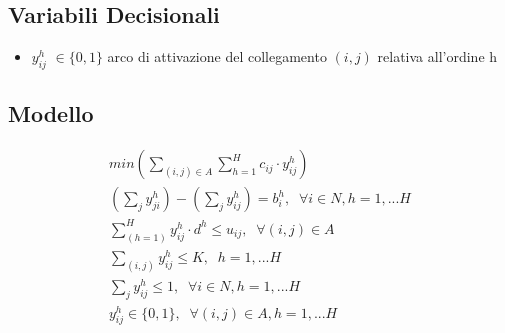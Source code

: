 \documentclass{article}
\begin{document}

\subsection{Variabili Decisionali}
\begin{itemize}
    \item $y_{ij}^h$ $\in \{0,1\}$ arco di attivazione del collegamento $(i,j)$ relativa all'ordine h
\end{itemize}

\subsection{Modello}

\label{problem1}
\begin{align}
    min (\sum_{(i,j) \in A}\sum_{h=1}^H c_{ij} \cdot y_{ij}^h)
    \label{mod:obj}
    \\
    (\sum_{j}y_{ji}^h)- (\sum_{j}y_{ij}^h ) = b_i^h, \; \; \forall i \in N, h=1, ... H
    \label{mod:v2}
    \\
    \sum_{(h=1)}^H y_{ij}^h \cdot d^h \leq u_{ij}, \; \; \forall (i,j) \in A
    \label{mod:v3}
    \\
    \sum_{(i,j)} y_{ij}^h  \leq K, \; \; h=1, ... H
    \label{mod:v4}
    \\
    \sum_{j} y_{ij}^h \leq 1, \; \; \forall i \in \textit{N} , h=1, ... H
    \label{mod:v5}
    \\
     y_{ij}^h \in \{0,1\}, \; \; \forall (i,j) \in A, h=1, ... H
    \label{mod:v6}
\end{align}
\end{document}
